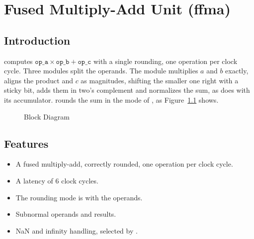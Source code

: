 \chapter{Fused Multiply-Add Unit (ffma)}
\label{ch:ffma}

\section{Introduction}

 computes $\mathtt{op\_a}\times\mathtt{op\_b}+\mathtt{op\_c}$ with a
single rounding, one operation per clock cycle. Three  modules split the
operands. The  module multiplies $a$ and $b$ exactly, aligns the
product and $c$ as magnitudes, shifting the smaller one right with a sticky bit, adds
them in two's complement and normalizes the sum, as  does with its
accumulator.  rounds the sum in the mode of , as
Figure~\ref{fig:ffma} shows.

\begin{figure}[H]
\centering
{}
\caption{ Block Diagram}
\label{fig:ffma}
\end{figure}

\section{Features}

\begin{itemize}
\item A fused multiply-add, correctly rounded, one operation per clock cycle.
\item A latency of 6 clock cycles.
\item The rounding mode is  with the operands.
\item Subnormal operands and results.
\item NaN and infinity handling, selected by .
\end{itemize}

